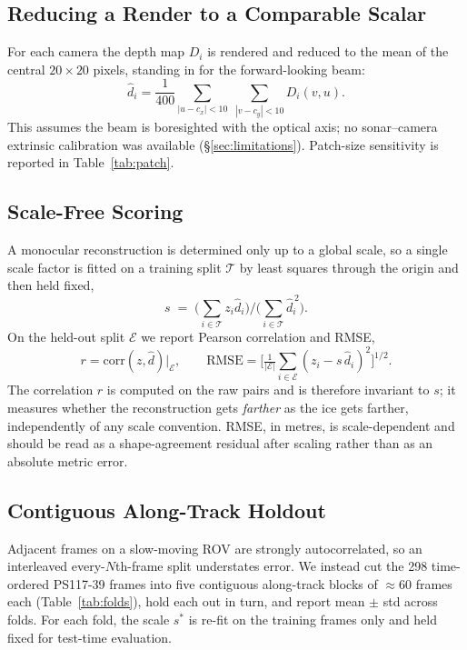 \documentclass[conference]{IEEEtran}
\begin{document}
\subsection{Reducing a Render to a Comparable Scalar}
\label{sec:patch}

For each camera the depth map $D_i$ is rendered and reduced to the mean of the
central $20 \times 20$ pixels, standing in for the forward-looking beam:
\begin{equation}
  \hat d_i = \frac{1}{400}
    \sum_{|u-c_x|<10}\;\sum_{|v-c_y|<10} D_i(v,u).
\end{equation}
This assumes the beam is boresighted with
the optical axis; no sonar--camera extrinsic calibration was available
(\S\ref{sec:limitations}). Patch-size sensitivity is reported in
Table~\ref{tab:patch}.

\subsection{Scale-Free Scoring}

A monocular reconstruction is determined only up to a global scale, so a single
scale factor is fitted on a training split $\mathcal{T}$ by least squares
through the origin and then held fixed,
\begin{equation}
  s \;=\; \Big(\textstyle\sum_{i\in\mathcal{T}} z_i \hat d_i\Big)
          \Big/\Big(\textstyle\sum_{i\in\mathcal{T}} \hat d_i^{\,2}\Big).
\end{equation}
On the held-out split $\mathcal{E}$ we report Pearson correlation and RMSE,
\begin{equation}
  r = \mathrm{corr}(z, \hat d)\big|_{\mathcal{E}},
  \qquad
  \mathrm{RMSE} = \Big[\tfrac{1}{|\mathcal{E}|}
    \textstyle\sum_{i\in\mathcal{E}} (z_i - s\,\hat d_i)^2\Big]^{1/2}.
\end{equation}
The correlation $r$ is computed on the raw pairs and is therefore invariant to
$s$; it measures whether the reconstruction gets \emph{farther} as the ice gets
farther, independently of any scale convention. RMSE, in metres, is
scale-dependent and should be read as a shape-agreement residual after
scaling rather than as an absolute metric error.

\subsection{Contiguous Along-Track Holdout}

Adjacent frames on a slow-moving ROV are strongly autocorrelated, so an
interleaved every-$N$th-frame split understates error. We instead cut the
298 time-ordered PS117-39 frames into five contiguous along-track blocks of
$\approx 60$ frames each (Table~\ref{tab:folds}), hold each out in turn, and
report mean $\pm$ std across folds. For each fold, the scale $s^{*}$ is
re-fit on the training frames only and held fixed for test-time evaluation.
\end{document}
